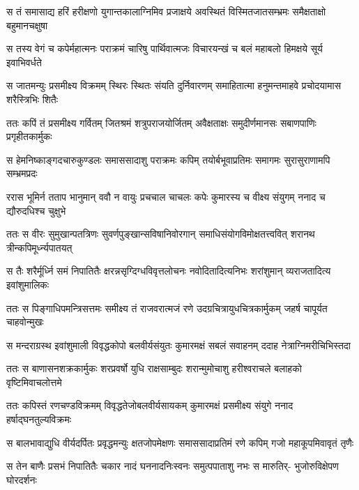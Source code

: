 \fourlineindentedshloka
{स तं समासाद्य हरिं हरीक्षणो}
{युगान्तकालाग्निमिव प्रजाक्षये}
{अवस्थितं विस्मितजातसम्भ्रमः}
{समैक्षताक्षो बहुमानचक्षुषा} %

\fourlineindentedshloka
{स तस्य वेगं च कपेर्महात्मनः}
{पराक्रमं चारिषु पार्थिवात्मजः}
{विचारयन्खं च बलं महाबलो}
{हिमक्षये सूर्य इवाभिवर्धते} %

\fourlineindentedshloka
{स जातमन्युः प्रसमीक्ष्य विक्रमम्}
{स्थिरः स्थितः संयति दुर्निवारणम्}
{समाहितात्मा हनुमन्तमाहवे}
{प्रचोदयामास शरैस्त्रिभिः शितैः} %

\fourlineindentedshloka
{ततः कपिं तं प्रसमीक्ष्य गर्वितम्}
{जितश्रमं शत्रुपराजयोर्जितम्}
{अवैक्षताक्षः समुदीर्णमानसः}
{सबाणपाणिः प्रगृहीतकार्मुकः} %

\fourlineindentedshloka
{स हेमनिष्काङ्गदचारुकुण्डलः}
{समाससादाशु पराक्रमः कपिम्}
{तयोर्बभूवाप्रतिमः समागमः}
{सुरासुराणामपि सम्भ्रमप्रदः} %

\fourlineindentedshloka
{ररास भूमिर्न तताप भानुमान्}
{ववौ न वायुः प्रचचाल चाचलः}
{कपेः कुमारस्य च वीक्ष्य संयुगम्}
{ननाद च द्यौरुदधिश्च चुक्षुभे} %

\fourlineindentedshloka
{ततः स वीरः सुमुखान्पतत्रिणः}
{सुवर्णपुङ्खान्सविषानिवोरगान्}
{समाधिसंयोगविमोक्षतत्त्ववित्}
{शरानथ त्रीन्कपिमूर्ध्न्यपातयत्} %

\fourlineindentedshloka
{स तैः शरैर्मूर्ध्नि समं निपातितैः}
{क्षरन्नसृग्दिग्धविवृत्तलोचनः}
{नवोदितादित्यनिभः शरांशुमान्}
{व्यराजतादित्य इवांशुमालिकः} %

\fourlineindentedshloka
{ततः स पिङ्गाधिपमन्त्रिसत्तमः}
{समीक्ष्य तं राजवरात्मजं रणे}
{उदग्रचित्रायुधचित्रकार्मुकम्}
{जहर्ष चापूर्यत चाहवोन्मुखः} %

\fourlineindentedshloka
{स मन्दराग्रस्थ इवांशुमाली}
{विवृद्धकोपो बलवीर्यसंयुतः}
{कुमारमक्षं सबलं सवाहनम्}
{ददाह नेत्राग्निमरीचिभिस्तदा} %

\fourlineindentedshloka
{ततः स बाणासनशक्रकार्मुकः}
{शरप्रवर्षो युधि राक्षसाम्बुदः}
{शरान्मुमोचाशु हरीश्वराचले}
{बलाहको वृष्टिमिवाचलोत्तमे} %

\fourlineindentedshloka
{ततः कपिस्तं रणचण्डविक्रमम्}
{विवृद्धतेजोबलवीर्यसायकम्}
{कुमारमक्षं प्रसमीक्ष्य संयुगे}
{ननाद हर्षाद्घनतुल्यविक्रमः} %

\fourlineindentedshloka
{स बालभावाद्युधि वीर्यदर्पितः}
{प्रवृद्धमन्युः क्षतजोपमेक्षणः}
{समाससादाप्रतिमं रणे कपिम्}
{गजो महाकूपमिवावृतं तृणैः} %

\fourlineindentedshloka
{स तेन बाणैः प्रसभं निपातितैः}
{चकार नादं घननादनिःस्वनः}
{समुत्पपाताशु नभः स मारुतिर्-}
{भुजोरुविक्षेपण घोरदर्शनः} %

